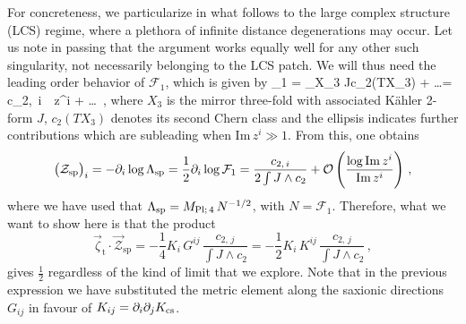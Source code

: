 For concreteness, we particularize in what follows to the large complex structure (LCS) regime, where a plethora of infinite distance degenerations may occur. Let us note in passing that the argument works equally well for any other such singularity, not necessarily belonging to the LCS patch. We will thus need the leading order behavior of $\mathcal{F}_1$, which is given by \cite{Bershadsky:1993ta,Bershadsky:1993cx} 
%
\beq
	_1 =  \int_{X_3} J\wedge c_2(TX_3) + \ldots =  c_{2,\, i}\, \, z^i + \ldots\, ,
\label{eq:F1LCS}
\eeq
% 
where $X_3$ is the mirror three-fold with associated K\"ahler 2-form $J$, $c_2(TX_3)$ denotes its second Chern class and the ellipsis indicates further contributions which are subleading when $\text{Im}\, z^i \gg 1$. From this, one obtains
%
\begin{equation}
	\left(\mathcal{Z}_{\text{sp}}\right)_i = - \partial_i \log \Lambda_{\text{sp}} = \frac{1}{2} \partial_i \log \mathcal{F}_1 = \frac{c_{2,\, i}}{2 \int J\wedge c_2} + \mathcal{O} \left( \frac{\log \text{Im}\, z^i}{\text{Im}\, z^i} \right)\, ,
\end{equation}
%
where we have used that $\Lambda_{\text{sp}}= M_{\text{Pl;}\, 4}\, N^{-1/2}$, with $N= \mathcal{F}_1$. Therefore, what we want to show here is that the product
%
\begin{equation}\label{eq:IIBproduct}
	\vec{\zeta}_{\text{t}} \cdot \vec{\mathcal{Z}}_{\text{sp}} =-\frac{1}{4} K_i\, G^{i j}\, \frac{c_{2,\, j}}{\int J\wedge c_2} = -\frac{1}{2} K_i\, K^{i j}\, \frac{c_{2,\, j}}{\int J\wedge c_2}\, ,
\end{equation}
%
gives $\frac{1}{2}$ regardless of the kind of limit that we explore. Note that in the previous expression we have substituted the metric element along the saxionic directions $G_{i j}$ in favour of $ K_{i j} = \partial_i \partial_j K_{\rm cs}$. 
	
